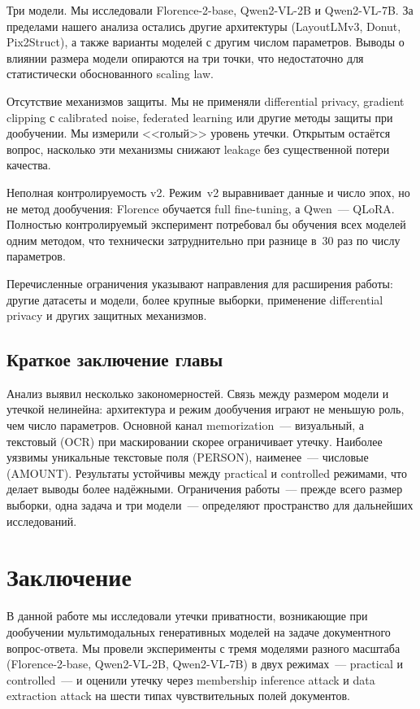 \documentclass[a4paper,12pt]{extarticle}
\begin{document}
Три модели. Мы исследовали Florence-2-base, Qwen2-VL-2B и Qwen2-VL-7B. За пределами нашего анализа остались другие архитектуры (LayoutLMv3, Donut, Pix2Struct), а также варианты моделей с другим числом параметров. Выводы о влиянии размера модели опираются на три точки, что недостаточно для статистически обоснованного scaling law.

Отсутствие механизмов защиты. Мы не применяли differential privacy, gradient clipping с calibrated noise, federated learning или другие методы защиты при дообучении. Мы измерили <<голый>> уровень утечки. Открытым остаётся вопрос, насколько эти механизмы снижают leakage без существенной потери качества.

Неполная контролируемость v2. Режим~v2 выравнивает данные и число эпох, но не метод дообучения: Florence обучается full fine-tuning, а Qwen~--- QLoRA. Полностью контролируемый эксперимент потребовал бы обучения всех моделей одним методом, что технически затруднительно при разнице в~30 раз по числу параметров.

Перечисленные ограничения указывают направления для расширения работы: другие датасеты и модели, более крупные выборки, применение differential privacy и других защитных механизмов.

\subsection{Краткое заключение главы}
\label{sec:discussion_summary}

Анализ выявил несколько закономерностей. Связь между размером модели и утечкой нелинейна: архитектура и режим дообучения играют не меньшую роль, чем число параметров. Основной канал memorization~--- визуальный, а текстовый (OCR) при маскировании скорее ограничивает утечку. Наиболее уязвимы уникальные текстовые поля (PERSON), наименее~--- числовые (AMOUNT). Результаты устойчивы между practical и controlled режимами, что делает выводы более надёжными. Ограничения работы~--- прежде всего размер выборки, одна задача и три модели~--- определяют пространство для дальнейших исследований.


\section*{Заключение}
\label{sec:conclusion}

В данной работе мы исследовали утечки приватности, возникающие при дообучении мультимодальных генеративных моделей на задаче документного вопрос-ответа. Мы провели эксперименты с тремя моделями разного масштаба (Florence-2-base, Qwen2-VL-2B, Qwen2-VL-7B) в двух режимах~--- practical и controlled~--- и оценили утечку через membership inference attack и data extraction attack на шести типах чувствительных полей документов.
\end{document}
